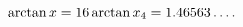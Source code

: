 \[\mathop{\mathrm{arctan}\/}\nolimits x=16\mathop{\mathrm{arctan}\/}\nolimits x_%
{4}=1.46563\dots.\]